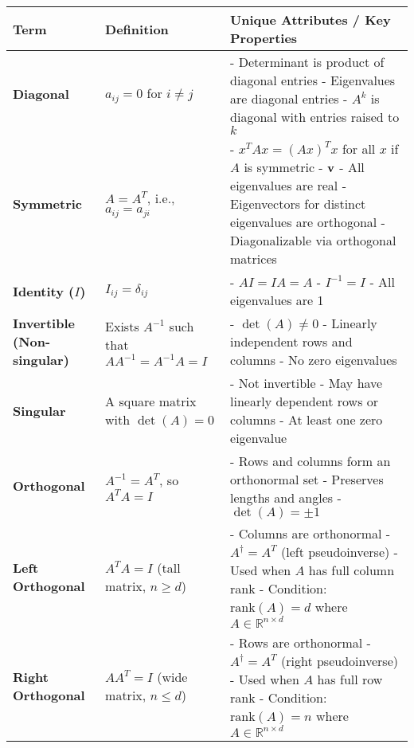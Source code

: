 \documentclass[12pt]{article}
\begin{document}
\begin{longtable}{|>{\bfseries}m{3.5cm}|m{5cm}|m{10.5cm}|}
		\hline
		\textbf{Term} & \textbf{Definition} & \textbf{Unique Attributes /
		Key Properties} \\
		\hline
		Diagonal & $a_{ij} = 0$ for $i \ne j$ &
		- Determinant is product of diagonal entries \newline
		- Eigenvalues are diagonal entries \newline
		- $A^k$ is diagonal with entries raised to $k$ \\
		\hline
		Symmetric & $A = A^T$, i.e., $a_{ij} = a_{ji}$ &
		- $x^T A x = (A x)^T x$ for all $x$ if $A$ is symmetric \newline
		- $\mathbf{v}$
		- All eigenvalues are real \newline
		- Eigenvectors for distinct eigenvalues are orthogonal \newline
		- Diagonalizable via orthogonal matrices \\
		\hline
		Identity ($I$) & $I_{ij} = \delta_{ij}$ &
		- $AI = IA = A$ \newline
		- $I^{-1} = I$ \newline
		- All eigenvalues are 1 \\
		\hline
		Invertible (Non-singular) & Exists $A^{-1}$ such that $AA^{-1} =
		A^{-1}A = I$ &
		- $\det(A) \ne 0$ \newline
		- Linearly independent rows and columns \newline
		- No zero eigenvalues \\
		\hline
		Singular & A square matrix with $\det(A) = 0$ &
		- Not invertible \newline
		- May have linearly dependent rows or columns \newline
		- At least one zero eigenvalue \\
		\hline
		Orthogonal & $A^{-1} = A^T$, so $A^T A = I$ &
		- Rows and columns form an orthonormal set \newline
		- Preserves lengths and angles \newline
		- $\det(A) = \pm 1$ \\
		\hline
		Left Orthogonal & $A^T A = I$ (tall matrix, $n \geq d$) &
		- Columns are orthonormal \newline
		- $A^\dagger = A^T$ (left pseudoinverse) \newline
		- Used when $A$ has full column rank \newline
		- Condition: $\text{rank}(A) = d$ where $A \in \mathbb{R}^{n \times d}$ \\
		\hline
		Right Orthogonal & $A A^T = I$ (wide matrix, $n \leq d$) &
		- Rows are orthonormal \newline
		- $A^\dagger = A^T$ (right pseudoinverse) \newline
		- Used when $A$ has full row rank \newline
		- Condition: $\text{rank}(A) = n$ where $A \in \mathbb{R}^{n \times d}$ \\


\end{longtable}
\end{document}
